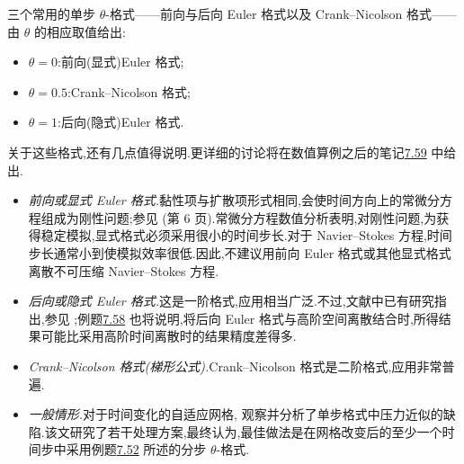 \begin{example}
\label{ex:time-dependent-crank-nicolson}
三个常用的单步 $\theta$-格式——前向与后向 Euler 格式以及 Crank--Nicolson 格式——由 $\theta$ 的相应取值给出:
\begin{itemize}
  \item $\theta=0$:前向(显式)Euler 格式;
  \item $\theta=0.5$:Crank--Nicolson 格式;
  \item $\theta=1$:后向(隐式)Euler 格式.
\end{itemize}
关于这些格式,还有几点值得说明.更详细的讨论将在数值算例之后的笔记\hyperref[note:theta-scheme-comments]{7.59} 中给出.
\begin{itemize}
  \item \textit{前向或显式 Euler 格式.}黏性项与扩散项形式相同,会使时间方向上的常微分方程组成为刚性问题;参见 \textcite{HairerWanner2010}(第 6 页).常微分方程数值分析表明,对刚性问题,为获得稳定模拟,显式格式必须采用很小的时间步长.对于 Navier--Stokes 方程,时间步长通常小到使模拟效率很低.因此,不建议用前向 Euler 格式或其他显式格式离散不可压缩 Navier--Stokes 方程.
  \item \textit{后向或隐式 Euler 格式.}这是一阶格式,应用相当广泛.不过,文献中已有研究指出,参见 \textcite{JohnMatthiesRang2006a};例题\hyperref[ex:time-dependent-accuracy-comparison]{7.58} 也将说明,将后向 Euler 格式与高阶空间离散结合时,所得结果可能比采用高阶时间离散时的结果精度差得多.
  \item \textit{Crank--Nicolson 格式(梯形公式).}Crank--Nicolson 格式是二阶格式,应用非常普遍.
  \item \textit{一般情形.}对于时间变化的自适应网格,\textcite{BesierWollner2012} 观察并分析了单步格式中压力近似的缺陷.该文研究了若干处理方案,最终认为,最佳做法是在网格改变后的至少一个时间步中采用例题\hyperref[ex:fractional-step-theta-scheme]{7.52} 所述的分步 $\theta$-格式.
\end{itemize}
\end{example}

